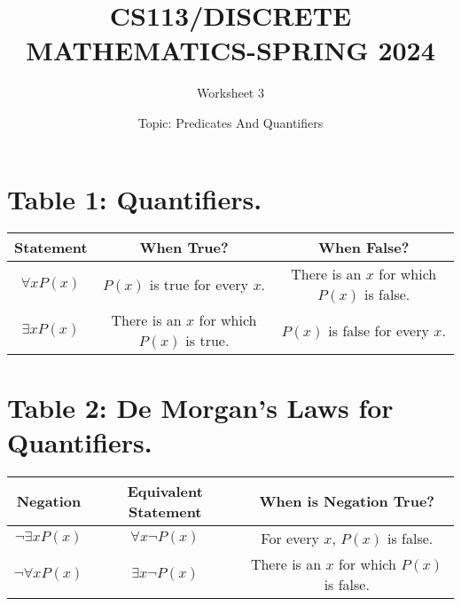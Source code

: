 \documentclass{exam}
\title{CS113/DISCRETE MATHEMATICS-SPRING 2024}
\author{Worksheet 3}
\date{Topic: Predicates And Quantifiers}
\begin{document}
\maketitle

\begin{center}
\end{center}

\vspace{5mm}

\vspace{5mm}

\section{Table 1: Quantifiers. }
\vspace{5mm}
\begin{center}
\begin{tabular}{|c|c|c|}
  \hline
  Statement & When True? & When False? \\
  \hline
  $\forall x P(x)$ & $P(x)$ is true for every $x$. & There is an $x$ for which $P(x)$ is false. \\
  $\exists x P(x)$ & There is an $x$ for which $P(x)$ is true. & $P(x)$ is false for every $x$. \\
  \hline
\end{tabular}
\end{center}
\vspace{5mm}
\section{Table 2: De Morgan’s Laws for Quantifiers.}
\begin{center}
\begin{tabular}{|c|c|c|}
  \hline
  Negation & Equivalent Statement & When is Negation True? \\
  \hline
  $\lnot\exists x P(x)$ & $\forall x \lnot P(x)$ & For every $x$, $P(x)$ is false. \\
  $\lnot\forall x P(x)$ & $\exists x \lnot P(x)$ & There is an $x$ for which $P(x)$ is false. \\
  \hline
\end{tabular}
\end{center}
\vspace{5mm}
\end{document}
